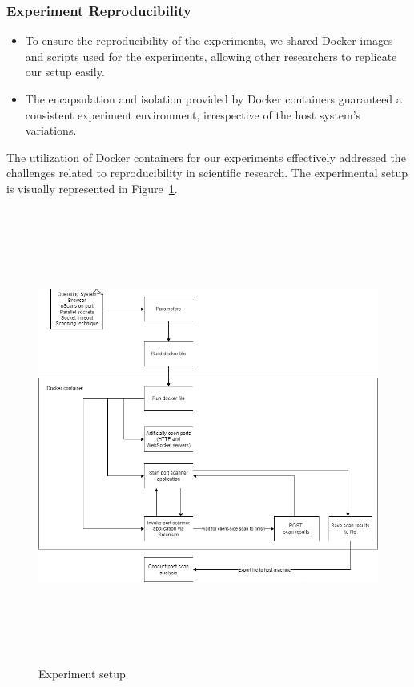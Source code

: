 \subsubsection{Experiment Reproducibility}
\begin{itemize}
    \item To ensure the reproducibility of the experiments, we shared Docker images and scripts used for the experiments, allowing other researchers to replicate our setup easily.
    \item The encapsulation and isolation provided by Docker containers guaranteed a consistent experiment environment, irrespective of the host system's variations.
\end{itemize}

The utilization of Docker containers for our experiments effectively addressed the challenges related to reproducibility in scientific research. The experimental setup is visually represented in Figure~\ref{fig:experiment}.

\begin{figure}[tbh]
    \centering
\includegraphics[width=15cm, height=15cm, keepaspectratio]{port_scanning_techniques/img/portscan_experiment.png}
    \caption{Experiment setup}
    \label{fig:experiment}
\end{figure}


